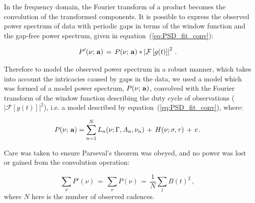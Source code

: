 In the frequency domain, the Fourier transform of a product becomes the convolution of the transformed components. It is possible to express the observed power spectrum of data with periodic gaps in terms of the window function and the gap-free power spectrum, given in equation~(\ref{eq:PSD_fit_conv}):

\begin{equation}
P'(\nu; \,{\bf a}) \, = \, P(\nu; \,{\bf a}) * \left|\mathcal{F}\left[g(t)\right]\right|^2 \, .
\label{eq:PSD_fit_conv}
\end{equation}

Therefore to model the observed power spectrum in a robust manner, which takes into account the intricacies caused by gaps in the data, we used a model which was formed of a model power spectrum, $P(\nu; \,{\bf a})$, convolved with the Fourier transform of the window function describing the duty cycle of observations ($\left|\mathcal{F}\left[g(t)\right]\right|^2$), i.e. a model described by equation~(\ref{eq:PSD_fit_conv}), where:


\begin{equation}
P(\nu; \,{\bf a}) = \sum_{n=1}^{N} L_n(\nu; \Gamma, A_n, \nu_n) \, + \, H(\nu; \sigma, \tau) \, + \, c \, .
\label{eq:PSD_model}
\end{equation}

Care was taken to ensure Parseval's theorem was obeyed, and no power was lost or gained from the convolution operation: 

\begin{equation}
\sum_{\nu} P'(\nu) \, = \,\sum_{\nu} P(\nu) \, = \, \frac{1}{N} \sum_{t}  B(t)^2 \, ,
\label{eq:parseval}
\end{equation}
%
where $N$ here is the number of observed cadences.




